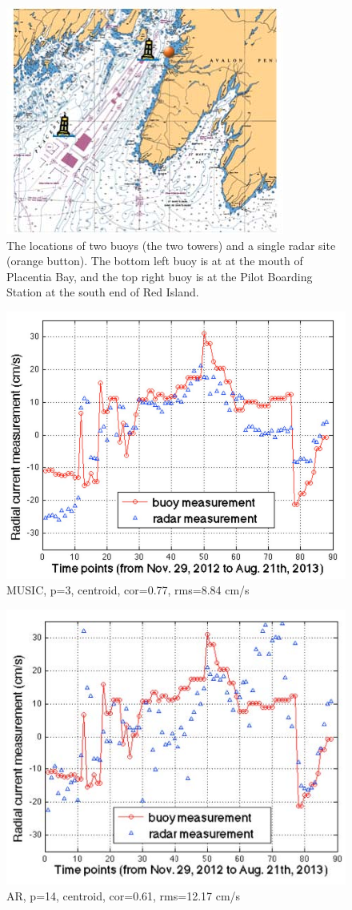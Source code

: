 \documentclass[12pt]{beamer}
\begin{document}
\begin{frame}
  \begin{figure}[htbp]
      \includegraphics[width=0.5\linewidth]{figs/f4.jpg}
       \caption{The locations of two buoys (the two towers) and a single
    radar site (orange button). The bottom left buoy is at at the mouth
    of Placentia Bay, and the top right buoy is at the Pilot Boarding
    Station at the south end of Red Island.}
  \end{figure}
\end{frame}

\begin{frame}
  \begin{figure}[htbp]
  \includegraphics[width=0.5\linewidth]{figs/a.jpg}
       \caption{MUSIC, p=3, centroid, cor=0.77,
       rms=8.84 cm/s}
      \end{figure}
\end{frame}
\begin{frame}
  \begin{figure}[htbp]
      \includegraphics[width=0.5\linewidth]{figs/b.jpg}
       \caption{AR, p=14, centroid, cor=0.61,
       rms=12.17 cm/s}
  \end{figure}
\end{frame}
\end{document}

